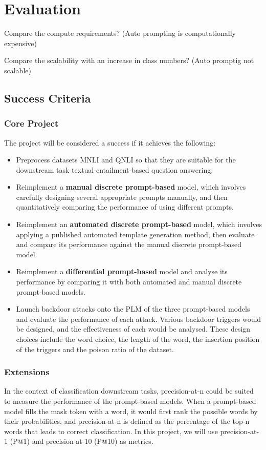 \chapter{Evaluation}
Compare the compute requirements? (Auto prompting is computationally expensive)

Compare the scalability with an increase in class numbers? (Auto promptig not scalable)
\section{Success Criteria}
\subsection{Core Project}
The project will be considered a success if it achieves the following:
\begin{itemize}
    \item Preprocess datasets MNLI and QNLI so that they are suitable for the downstream task textual-entailment-based question answering.
    \item Reimplement a \textbf{manual discrete prompt-based} model, which involves carefully designing several appropriate prompts manually, and then quantitatively comparing the performance of using different prompts.
    \item Reimplement an \textbf{automated discrete prompt-based} model, which involves applying a published automated template generation method, then evaluate and compare its performance against the manual discrete prompt-based model.
    \item Reimplement a \textbf{differential prompt-based} model and analyse its performance by comparing it with both automated and manual discrete prompt-based models.
    \item Launch backdoor attacks onto the PLM of the three prompt-based models and evaluate the performance of each attack. Various backdoor triggers would be designed, and the effectiveness of each would be analysed. These design choices include the word choice, the length of the word, the insertion position of the triggers and the poison ratio of the dataset.
\end{itemize}

\subsection{Extensions}
In the context of classification downstream tasks, precision-at-n could be suited to measure the performance of the prompt-based models. When a prompt-based model fills the mask token with a word, it would first rank the possible words by their probabilities, and precision-at-n is defined as the percentage of the top-n words that leads to correct classification. In this project, we will use precision-at-1 (P@1) and precision-at-10 (P@10) as metrics.

